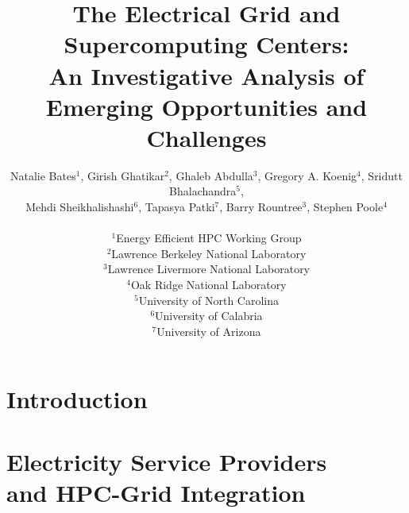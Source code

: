 \documentclass{../style/sig-alternate}
\begin{document}
%

\title{
The Electrical Grid and Supercomputing Centers:\\
An Investigative Analysis of Emerging Opportunities and Challenges
}

\author{Natalie Bates$^1$, Girish Ghatikar$^2$,
  Ghaleb Abdulla$^3$, Gregory A. Koenig$^4$, Sridutt Bhalachandra$^5$, \\
	Mehdi Sheikhalishashi$^6$, Tapasya Patki$^7$, Barry Rountree$^3$, Stephen Poole$^4$
	\\ \\
	$^1$Energy Efficient HPC Working Group\\
       $^2$Lawrence Berkeley National Laboratory\\
       $^3$Lawrence Livermore National Laboratory\\
			 $^4$Oak Ridge National Laboratory\\
			 $^5$University of North Carolina\\
			$^6$University of Calabria\\
			$^7$University of Arizona
	}


\maketitle              %





%
\section{Introduction}
\label{sec:intro}


\section{Electricity Service Providers\\
 and HPC-Grid Integration}
\label{sec:ESPintegration}

\end{document}
